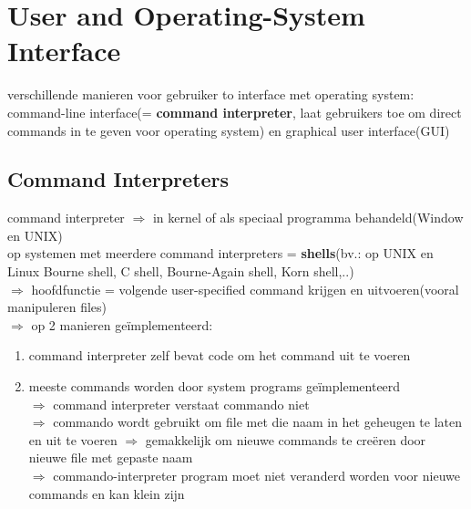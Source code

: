 \documentclass{report}
\begin{document}
\section{User and Operating-System Interface}
verschillende manieren voor gebruiker to interface met operating system: command-line interface(= \textbf{command interpreter}, laat gebruikers toe om direct commands in te geven voor operating system) en graphical user interface(GUI)
\subsection{Command Interpreters}
command interpreter $\Rightarrow$ in kernel of als speciaal programma behandeld(Window en UNIX)
\\op systemen met meerdere command interpreters = \textbf{shells}(bv.: op UNIX en Linux Bourne shell, C shell, Bourne-Again shell, Korn shell,..)
\\$\Rightarrow$ hoofdfunctie = volgende user-specified command krijgen en uitvoeren(vooral manipuleren files)
\\$\Rightarrow$ op 2 manieren ge\"implementeerd:
\begin{enumerate}
\item command interpreter zelf bevat code om het command uit te voeren
\item meeste commands worden door system programs ge\"implementeerd 
\\$\Rightarrow$ command interpreter verstaat commando niet
\\$\Rightarrow$ commando wordt gebruikt om file met die naam in het geheugen te laten en uit te voeren $\Rightarrow$ gemakkelijk om nieuwe commands te cre\"eren door nieuwe file met gepaste naam
\\$\Rightarrow$ commando-interpreter program moet niet veranderd worden voor nieuwe commands en kan klein zijn
\end{enumerate}
\end{document}
